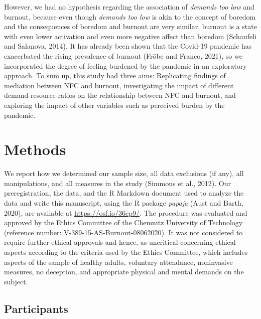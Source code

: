\documentclass[
  english,
  man,floatsintext]{apa6}
\begin{document}
However, we had no hypothesis regarding the association of \emph{demands too low} and burnout, because even though \emph{demands too low} is akin to the concept of boredom and the consequences of boredom and burnout are very similar, burnout is a state with even lower activation and even more negative affect than boredom (Schaufeli and Salanova, 2014).
It has already been shown that the Covid-19 pandemic has exacerbated the rising prevalence of burnout (Fröbe and Franco, 2021), so we incorporated the degree of feeling burdened by the pandemic in an exploratory approach.
To sum up, this study had three aims: Replicating findings of mediation between NFC and burnout, investigating the impact of different demand-resource-ratios on the relationship between NFC and burnout, and exploring the impact of other variables such as perceived burden by the pandemic.

\hypertarget{methods}{%
\section{Methods}\label{methods}}

We report how we determined our sample size, all data exclusions (if any), all manipulations, and all measures in the study (Simmons et al., 2012).
Our preregistration, the data, and the R Markdown document used to analyze the data and write this manuscript, using the R package \emph{papaja} (Aust and Barth, 2020), are available at \url{https://osf.io/36ep9/}.
The procedure was evaluated and approved by the Ethics Committee of the Chemnitz University of Technology (reference number: V-389-15-AS-Burnout-08062020).
It was not considered to require further ethical approvals and hence, as uncritical concerning ethical aspects according to the criteria used by the Ethics Committee, which includes aspects of the sample of healthy adults, voluntary attendance, noninvasive measures, no deception, and appropriate physical and mental demands on the subject.

\hypertarget{participants}{%
\subsection{Participants}\label{participants}}
\end{document}
